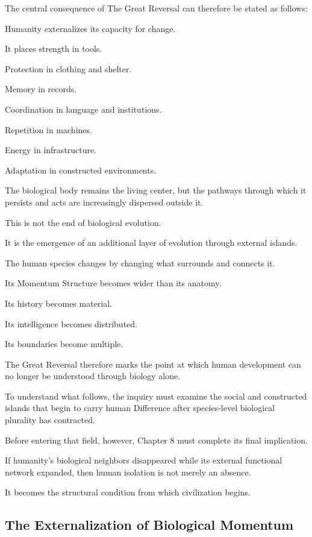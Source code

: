 The central consequence of The Great Reversal can therefore be stated as follows:

Humanity externalizes its capacity for change.

It places strength in tools.

Protection in clothing and shelter.

Memory in records.

Coordination in language and institutions.

Repetition in machines.

Energy in infrastructure.

Adaptation in constructed environments.

The biological body remains the living center, but the pathways through which it persists and acts are increasingly dispersed outside it.

This is not the end of biological evolution.

It is the emergence of an additional layer of evolution through external islands.

The human species changes by changing what surrounds and connects it.

Its Momentum Structure becomes wider than its anatomy.

Its history becomes material.

Its intelligence becomes distributed.

Its boundaries become multiple.

The Great Reversal therefore marks the point at which human development can no longer be understood through biology alone.

To understand what follows, the inquiry must examine the social and constructed islands that begin to carry human Difference after species-level biological plurality has contracted.

Before entering that field, however, Chapter 8 must complete its final implication.

If humanity’s biological neighbors disappeared while its external functional network expanded, then human isolation is not merely an absence.

It becomes the structural condition from which civilization begins.

\subsection*{\textbf{The Externalization of Biological Momentum}}


